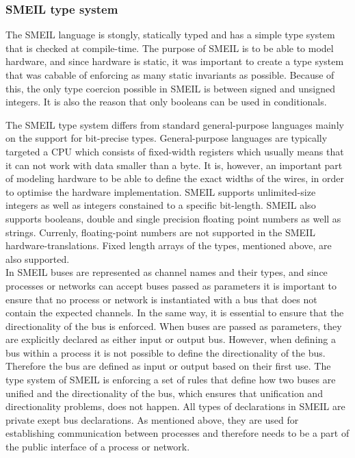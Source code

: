\subsubsection{SMEIL type system}
The SMEIL language is stongly, statically typed and has a simple type system that is checked at compile-time. The purpose of SMEIL is to be able to model hardware, and since hardware is static, it was important to create a type system that was cabable of enforcing as many static invariants as possible.
Because of this, the only type coercion possible in SMEIL is between signed and unsigned integers. It is also the reason that only booleans can be used in conditionals.

The SMEIL type system differs from standard general-purpose languages mainly on the support for bit-precise types. General-purpose languages are typically targeted a CPU which consists of fixed-width registers which usually means that it can not work with data smaller than a byte. It is, however, an important part of modeling hardware to be able to define the exact widths of the wires, in order to optimise the hardware implementation. SMEIL supports unlimited-size integers as well as integers constained to a specific bit-length. SMEIL also supports booleans, double and single precision floating point numbers as well as strings. Currenly, floating-point numbers are not supported in the SMEIL hardware-translations. %
Fixed length arrays of the types, mentioned above, are also supported.\\

In SMEIL buses are represented as channel names and their types, and since processes or networks can accept buses passed as parameters it is important to ensure that no process or network is instantiated with a bus that does not contain the expected channels.
In the same way, it is essential to ensure that the directionality of the bus is enforced. When buses are passed as parameters, they are explicitly declared as either input or output bus. However, when defining a bus within a process it is not possible to define the directionality of the bus. Therefore the bus are defined as input or output based on their first use.
The type system of SMEIL is enforcing a set of rules that define how two buses are unified and the directionality of the bus, which ensures that unification and directionality problems, does not happen.
All types of declarations in SMEIL are private exept bus declarations. As mentioned above, they are used for establishing communication between processes and therefore needs to be a part of the public interface of a process or network.


